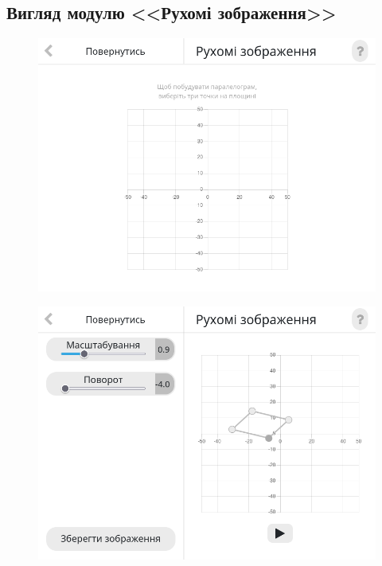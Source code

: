 \documentclass[oneside,14pt]{extarticle}
\begin{document}
\begin{normalsize}
	\subsection{Вигляд модулю <<Рухомі зображення>>}
	\begin{figure}[H]
		\centering
		\includegraphics[scale=0.6]{41}
		\caption{}
	\end{figure}
	
	\begin{figure}[H]
		\centering
		\includegraphics[scale=0.6]{42}
		\caption{}
	\end{figure}
	

\end{normalsize}
\end{document}
